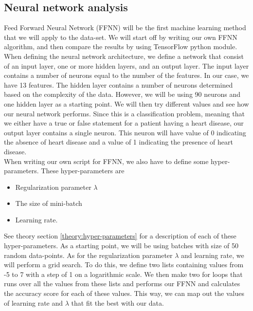 \documentclass[reprint,english,notitlepage]{revtex4-1}  %
\begin{document}
\subsection{Neural network analysis}
Feed Forward Neural Network (FFNN) will be the first machine learning method that we will apply to the data-set. We will start off by writing our own FFNN algorithm, and then compare the results by using TensorFlow python module.
\vspace{3mm}
\\
When defining the neural network architecture, we define a network that consist of an input layer, one or more hidden layers, and an output layer. The input layer contains a number of neurons equal to the number of the features. In our case, we have 13 features. The hidden layer contains a number of neurons determined based on the complexity of the data. However, we will be using 90 neurons and one hidden layer as a starting point. We will then try different values and see how our neural network performs. Since this is a classification problem, meaning that we either have a true or false statement for a patient having a heart disease, our output layer contains a single neuron. This neuron will have value of 0 indicating the absence of heart disease and a value of 1 indicating the presence of heart disease.
\vspace{3mm}
\\
When writing our own script for FFNN, we also have to  define some hyper-parameters. These hyper-parameters are
\begin{itemize}
    \item Regularization parameter $\lambda$
    \item The size of mini-batch
    \item Learning rate.
\end{itemize}
See theory section \ref{theory:hyper-parameters} for a description of each of these hyper-parameters. As a starting point, we will be using batches with size of 50 random data-points. As for the regularization parameter $\lambda$ and learning rate, we will perform a grid search. 
To do this, we define two lists containing values from -5 to 7 with a step of 1 on a logarithmic scale. We then make two for loops that runs over all the values from these lists and performs our FFNN and calculates the accuracy score for each of these values. This way, we can map out the values of learning rate and $\lambda$ that fit the best with our data.
\vspace{3mm}
\\
\end{document}
